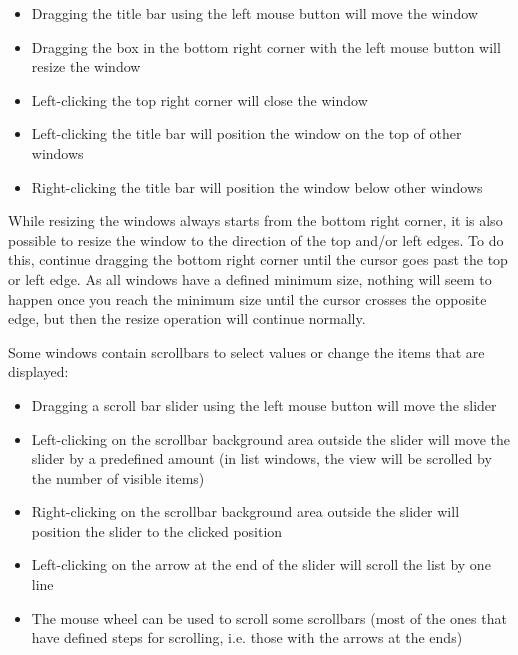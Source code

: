 \documentclass[a4paper,oneside,11pt]{memoir}
\begin{document}
\bigskip

\begin{itemize}
    \item Dragging the title bar using the left mouse button will move the window
    \item Dragging the box in the bottom right corner with the left mouse button will resize the window
    \item Left-clicking the top right corner will close the window
    \item Left-clicking the title bar will position the window on the top of other windows
    \item Right-clicking the title bar will position the window below other windows
\end{itemize}

\bigskip

While resizing the windows always starts from the bottom right corner, it is also possible to resize the window to the direction of the top and/or left edges. To do this, continue dragging the bottom right corner until the cursor goes past the top or left edge. As all windows have a defined minimum size, nothing will seem to happen once you reach the minimum size until the cursor crosses the opposite edge, but then the resize operation will continue normally.

\bigskip

Some windows contain scrollbars to select values or change the items that are displayed:

\bigskip

\begin{itemize}
    \item Dragging a scroll bar slider using the left mouse button will move the slider
    \item Left-clicking on the scrollbar background area outside the slider will move the slider by a predefined amount (in list windows, the view will be scrolled by the number of visible items)
    \item Right-clicking on the scrollbar background area outside the slider will position the slider to the clicked position
    \item Left-clicking on the arrow at the end of the slider will scroll the list by one line
    \item The mouse wheel can be used to scroll some scrollbars (most of the ones that have defined steps for scrolling, i.e. those with the arrows at the ends)
\end{itemize}
\end{document}
